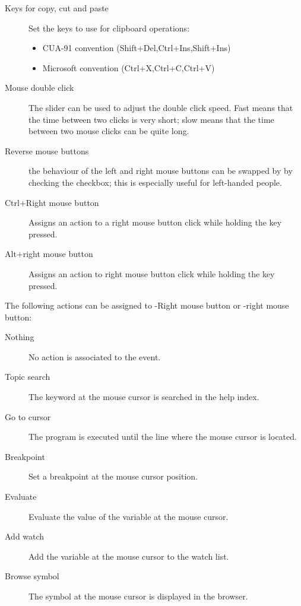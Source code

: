 \begin{description}
\item[Keys for copy, cut and paste] Set the keys to use for clipboard
operations:
\begin{itemize}
\item CUA-91 convention (Shift+Del,Ctrl+Ins,Shift+Ins)
\item Microsoft convention (Ctrl+X,Ctrl+C,Ctrl+V)
\end{itemize}
\item[Mouse double click]
The slider can be used to adjust the double click speed. Fast means that the
time between two clicks is very short; slow means that the time between two
mouse clicks can be quite long.
\item[Reverse mouse buttons]
the behaviour of the left and right mouse buttons can be swapped by
by checking the checkbox; this is especially useful for left-handed people.
\item[Ctrl+Right mouse button]
Assigns an action to a right mouse button click while holding the
 key pressed.
\item[Alt+right mouse button]
Assigns an action to right mouse button click while holding the
 key pressed.
\end{description}

The following actions can be assigned to -Right mouse button or
-right mouse button:
\begin{description}
\item[Nothing] No action is associated to the event.
\item [Topic search] The keyword at the mouse cursor is searched in the
help index.
\item [Go to cursor] The program is executed until the line where
the mouse cursor is located.
\item [Breakpoint] Set a breakpoint at the mouse cursor position.
\item [Evaluate] Evaluate the value of the variable at the mouse
cursor.
\item [Add watch] Add the variable at the mouse cursor to the
watch list.
\item [Browse symbol] The symbol at the mouse cursor is displayed
in the browser.
\end{description}

